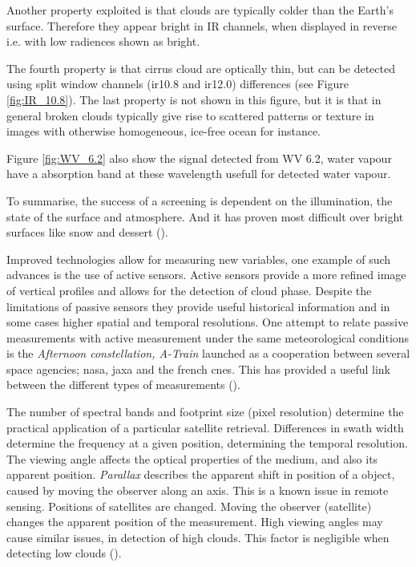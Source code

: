 Another property exploited is that clouds are typically colder than the Earth's surface. Therefore they appear bright in IR channels, when displayed in reverse i.e. with low radiences shown as bright. 

The fourth property is that cirrus cloud are optically thin, but can be detected using split window channels (\acrshort{ir}10.8 and \acrshort{ir}12.0) differences (see Figure \ref{fig:IR_10.8}). The last property is not shown in this figure, but it is that in general broken clouds typically give rise to scattered patterns or texture in images with otherwise homogeneous, ice-free ocean for instance. 

Figure \ref{fig:WV_6.2} also show the signal detected from WV 6.2, water  vapour have a absorption band at these wavelength usefull for detected water vapour. 

To summarise, the success of a screening is dependent on the illumination, the state of the surface and atmosphere. And it has proven most difficult over bright surfaces like snow and dessert (\cite{Karlsson2015AdvancingData}). 

Improved technologies allow for measuring new variables, one example of such advances is the use of active sensors. Active sensors provide a more refined image of vertical profiles and allows for the detection of cloud phase. Despite the limitations of passive sensors they provide useful historical information and in some cases higher spatial and temporal resolutions. One attempt to relate passive measurements with active measurement under the same meteorological conditions is the \textit{Afternoon constellation, A-Train} launched as a cooperation between several space agencies; \acrfull{nasa}, \acrlong{jaxa} and the french \acrfull{cnes}. This has provided a useful link between the different types of measurements (\cite{Stephens2018CloudsatSystem}). 

The number of spectral bands and footprint size (pixel resolution) determine the practical application of a particular satellite retrieval. Differences in swath width determine the frequency at a given position, determining the temporal resolution. The viewing angle affects the optical properties of the medium, and also its apparent position. \textit{Parallax} describes the apparent shift in position of a object, caused by moving the observer along an axis. This is a known issue in remote sensing. Positions of satellites are changed. Moving the observer (satellite) changes the apparent position of the measurement. 
High viewing angles may cause similar issues, in detection of high clouds. This factor is negligible when detecting low clouds (\cite{Joro2010ComparisonFinland}). 

